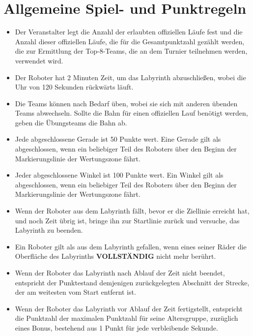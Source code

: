 \documentclass[a4paper,12pt]{article}
\begin{document}
\section{Allgemeine Spiel- und Punktregeln}
\begin{itemize}
	\item Der Veranstalter legt die Anzahl der erlaubten offiziellen Läufe
		fest und die Anzahl dieser offiziellen Läufe, die für die
		Gesamtpunktzahl gezählt werden, die zur Ermittlung der
		Top-8-Teams, die an dem Turnier teilnehmen werden, verwendet
		wird.
	\item Der Roboter hat 2 Minuten Zeit, um das Labyrinth abzuschließen,
		wobei die Uhr von 120 Sekunden rückwärts läuft.
	\item Die Teams können nach Bedarf üben, wobei sie sich mit anderen
		übenden Teams abwechseln. Sollte die Bahn für einen offiziellen
		Lauf benötigt werden, geben die Übungsteams die Bahn ab.
	\item Jede abgeschlossene Gerade ist 50 Punkte wert. Eine Gerade gilt
		als abgeschlossen, wenn ein beliebiger Teil des Roboters über
		den Beginn der Markierungslinie der Wertungszone fährt.
	\item Jeder abgeschlossene Winkel ist 100 Punkte wert. Ein Winkel gilt
		als abgeschlossen, wenn ein beliebiger Teil des Roboters über
		den Beginn der Markierungslinie der Wertungszone fährt.
	\item Wenn der Roboter aus dem Labyrinth fällt, bevor er die Ziellinie
		erreicht hat, und noch Zeit übrig ist, bringe ihn zur
		Startlinie zurück und versuche, das Labyrinth zu beenden.
	\item Ein Roboter gilt als aus dem Labyrinth gefallen, wenn eines
		seiner Räder die Oberfläche des Labyrinths \textbf{VOLLSTÄNDIG}
		nicht mehr berührt.
	\item Wenn der Roboter das Labyrinth nach Ablauf der Zeit nicht
		beendet, entspricht der Punktestand demjenigen zurückgelegten
		Abschnitt der Strecke, der am weitesten vom Start entfernt ist.
	\item Wenn der Roboter das Labyrinth vor Ablauf der Zeit fertigstellt,
		entspricht die Punktzahl der maximalen Punktzahl für seine
		Altersgruppe, zuzüglich eines Bonus, bestehend aus 1 Punkt für
		jede verbleibende Sekunde.
\end{itemize}
\end{document}
